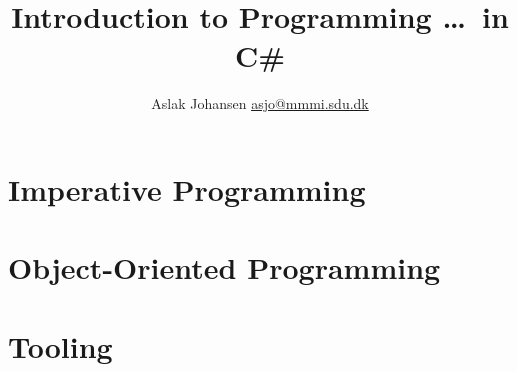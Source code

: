 \documentclass[a4paper, oneside]{memoir}
\begin{document}
\title{Introduction to Programming \ldots\ in C\#}
\author{Aslak Johansen \href{mailto:asjo@mmmi.sdu.dk}{asjo@mmmi.sdu.dk}}
\maketitle
\tableofcontents



\part{Imperative Programming}





\part{Object-Oriented Programming}
\part{Tooling}
\end{document}
